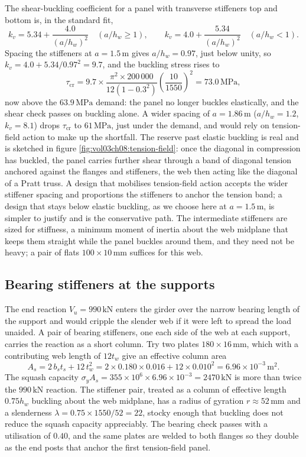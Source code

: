 The shear-buckling coefficient for a panel with transverse stiffeners
top and bottom is, in the standard fit,
\[
k_v = 5.34 + \frac{4.0}{(a/h_w)^2} \quad (a/h_w \geq 1), \qquad
k_v = 4.0 + \frac{5.34}{(a/h_w)^2} \quad (a/h_w < 1).
\]
Spacing the stiffeners at $a = 1.5\,\si{\meter}$ gives $a/h_w = 0.97$,
just below unity, so $k_v = 4.0 + 5.34/0.97^2 = 9.7$, and the buckling
stress rises to
\[
\tau_{\text{cr}} = 9.7 \times \frac{\pi^2 \times 200\,000}
{12(1 - 0.3^2)}\left(\frac{10}{1550}\right)^2 = 73.0\,\text{MPa},
\]
now above the $63.9\,\text{MPa}$ demand: the panel no longer buckles
elastically, and the shear check passes on buckling alone. A wider
spacing of $a = 1.86\,\si{\meter}$ ($a/h_w = 1.2$, $k_v = 8.1$) drops
$\tau_{\text{cr}}$ to $61\,\text{MPa}$, just under the demand, and would
rely on tension-field action to make up the shortfall. The reserve past
elastic buckling is real and is sketched in figure
\ref{fig:vol03ch08:tension-field}: once the diagonal in compression has
buckled, the panel carries further shear through a band of diagonal
tension anchored against the flanges and stiffeners, the web then acting
like the diagonal of a Pratt truss. A design that mobilises tension-field
action accepts the wider stiffener spacing and proportions the
stiffeners to anchor the tension band; a design that stays below elastic
buckling, as we choose here at $a = 1.5\,\si{\meter}$, is simpler to
justify and is the conservative path. The intermediate stiffeners are
sized for stiffness, a minimum moment of inertia about the web midplane
that keeps them straight while the panel buckles around them, and they
need not be heavy; a pair of flats $100 \times 10\,\si{\milli\meter}$
suffices for this web.



\subsection{Bearing stiffeners at the supports}

The end reaction $V_u = 990\,\text{kN}$ enters the girder over the
narrow bearing length of the support and would cripple the slender web
if it were left to spread the load unaided. A pair of bearing stiffeners,
one each side of the web at each support, carries the reaction as a short
column. Try two plates $180 \times 16\,\si{\milli\meter}$, which with a
contributing web length of $12 t_w$ give an effective column area
\[
A_s = 2\,b_s t_s + 12\,t_w^2
= 2 \times 0.180 \times 0.016 + 12 \times 0.010^2
= 6.96 \times 10^{-3}\,\si{\meter\squared}.
\]
The squash capacity $\sigma_y A_s = 355 \times 10^6 \times 6.96 \times
10^{-3} = 2470\,\text{kN}$ is more than twice the $990\,\text{kN}$
reaction. The stiffener pair, treated as a column of effective length
$0.75 h_w$ buckling about the web midplane, has a radius of gyration
$r \approx 52\,\si{\milli\meter}$ and a slenderness $\lambda =
0.75 \times 1550/52 = 22$, stocky enough that buckling does not reduce
the squash capacity appreciably. The bearing check passes with a
utilisation of $0.40$, and the same plates are welded to both flanges so
they double as the end posts that anchor the first tension-field panel.

